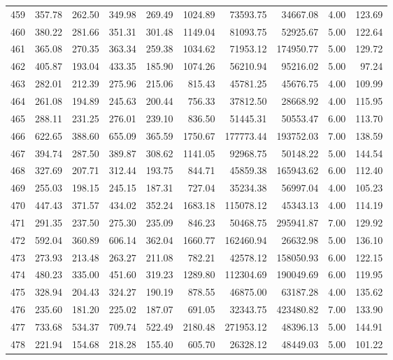 \begin{tabular}{lrrrrrrrrr}
459 & 357.78 & 262.50 & 349.98 & 269.49 & 1024.89 & 73593.75 & 34667.08 & 4.00 & 123.69 \\
460 & 380.22 & 281.66 & 351.31 & 301.48 & 1149.04 & 81093.75 & 52925.67 & 5.00 & 122.64 \\
461 & 365.08 & 270.35 & 363.34 & 259.38 & 1034.62 & 71953.12 & 174950.77 & 5.00 & 129.72 \\
462 & 405.87 & 193.04 & 433.35 & 185.90 & 1074.26 & 56210.94 & 95216.02 & 5.00 & 97.24 \\
463 & 282.01 & 212.39 & 275.96 & 215.06 & 815.43 & 45781.25 & 45676.75 & 4.00 & 109.99 \\
464 & 261.08 & 194.89 & 245.63 & 200.44 & 756.33 & 37812.50 & 28668.92 & 4.00 & 115.95 \\
465 & 288.11 & 231.25 & 276.01 & 239.10 & 836.50 & 51445.31 & 50553.47 & 6.00 & 113.70 \\
466 & 622.65 & 388.60 & 655.09 & 365.59 & 1750.67 & 177773.44 & 193752.03 & 7.00 & 138.59 \\
467 & 394.74 & 287.50 & 389.87 & 308.62 & 1141.05 & 92968.75 & 50148.22 & 5.00 & 144.54 \\
468 & 327.69 & 207.71 & 312.44 & 193.75 & 844.71 & 45859.38 & 165943.62 & 6.00 & 112.40 \\
469 & 255.03 & 198.15 & 245.15 & 187.31 & 727.04 & 35234.38 & 56997.04 & 4.00 & 105.23 \\
470 & 447.43 & 371.57 & 434.02 & 352.24 & 1683.18 & 115078.12 & 45343.13 & 4.00 & 114.19 \\
471 & 291.35 & 237.50 & 275.30 & 235.09 & 846.23 & 50468.75 & 295941.87 & 7.00 & 129.92 \\
472 & 592.04 & 360.89 & 606.14 & 362.04 & 1660.77 & 162460.94 & 26632.98 & 5.00 & 136.10 \\
473 & 273.93 & 213.48 & 263.27 & 211.08 & 782.21 & 42578.12 & 158050.93 & 6.00 & 122.15 \\
474 & 480.23 & 335.00 & 451.60 & 319.23 & 1289.80 & 112304.69 & 190049.69 & 6.00 & 119.95 \\
475 & 328.94 & 204.43 & 324.27 & 190.19 & 878.55 & 46875.00 & 63187.28 & 4.00 & 135.62 \\
476 & 235.60 & 181.20 & 225.02 & 187.07 & 691.05 & 32343.75 & 423480.82 & 7.00 & 133.90 \\
477 & 733.68 & 534.37 & 709.74 & 522.49 & 2180.48 & 271953.12 & 48396.13 & 5.00 & 144.91 \\
478 & 221.94 & 154.68 & 218.28 & 155.40 & 605.70 & 26328.12 & 48449.03 & 5.00 & 101.22 \\

\end{tabular}
